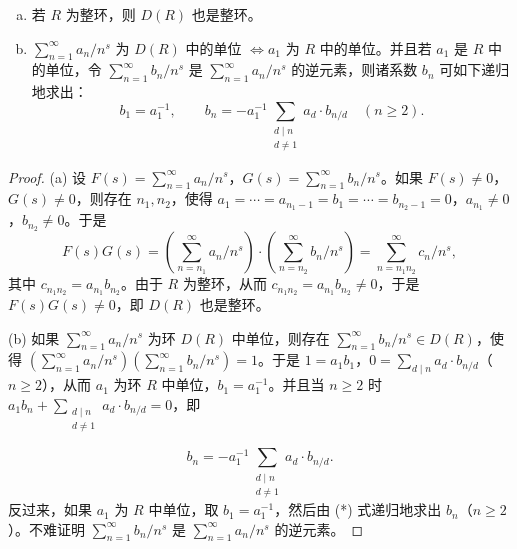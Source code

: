 \begin{lemma}\label{lem:ch4-1}
\begin{enumerate}[(a)]
  \item 若 $R$ 为整环，则 $D(R)$ 也是整环。
  \item $\sum_{n=1}^{\infty}a_n/n^s$ 为 $D(R)$ 中的单位 $\Leftrightarrow a_1$ 为 $R$ 中的单位。并且若 $a_1$ 是 $R$ 中的单位，令 $\sum_{n=1}^{\infty}b_n/n^s$ 是 $\sum_{n=1}^{\infty}a_n/n^s$ 的逆元素，则诸系数 $b_n$ 可如下递归地求出：
  \[
    b_1=a_1^{-1},\qquad b_n=-a_1^{-1}\sum_{\substack{d\mid n\\ d\neq 1}}a_d\cdot b_{n/d}\quad(n\geqslant 2).
  \]
\end{enumerate}
\end{lemma}

\begin{proof}
(a) 设 $F(s)=\sum_{n=1}^{\infty}a_n/n^s$，$G(s)=\sum_{n=1}^{\infty}b_n/n^s$。如果 $F(s)\neq 0$，$G(s)\neq 0$，则存在 $n_1,n_2$，使得 $a_1=\cdots=a_{n_1-1}=b_1=\cdots=b_{n_2-1}=0$，$a_{n_1}\neq 0$，$b_{n_2}\neq 0$。于是
\[
  F(s)G(s)=\left(\sum_{n=n_1}^{\infty}a_n/n^s\right)\cdot\left(\sum_{n=n_2}^{\infty}b_n/n^s\right)=\sum_{n=n_1n_2}^{\infty}c_n/n^s,
\]
其中 $c_{n_1n_2}=a_{n_1}b_{n_2}$。由于 $R$ 为整环，从而 $c_{n_1n_2}=a_{n_1}b_{n_2}\neq 0$，于是 $F(s)G(s)\neq 0$，即 $D(R)$ 也是整环。

\begin{sloppypar}
(b) 如果 $\sum_{n=1}^{\infty}a_n/n^s$ 为环 $D(R)$ 中单位，则存在 $\sum_{n=1}^{\infty}b_n/n^s\in D(R)$，使得 $\left(\sum_{n=1}^{\infty}a_n/n^s\right)\left(\sum_{n=1}^{\infty}b_n/n^s\right)=1$。于是 $1=a_1b_1$，$0=\sum_{d\mid n}a_d\cdot b_{n/d}$（$n\geqslant 2$），从而 $a_1$ 为环 $R$ 中单位，$b_1=a_1^{-1}$。并且当 $n\geqslant 2$ 时 $a_1b_n+\sum_{\substack{d\mid n\\ d\neq 1}}a_d\cdot b_{n/d}=0$，即
\end{sloppypar}
\begin{equation}  b_n=-a_1^{-1}\sum_{\substack{d\mid n\\ d\neq 1}}a_d\cdot b_{n/d}.\tag{*}\end{equation}
反过来，如果 $a_1$ 为 $R$ 中单位，取 $b_1=a_1^{-1}$，然后由 (*) 式递归地求出 $b_n$（$n\geqslant 2$）。不难证明 $\sum_{n=1}^{\infty}b_n/n^s$ 是 $\sum_{n=1}^{\infty}a_n/n^s$ 的逆元素。
\end{proof}

